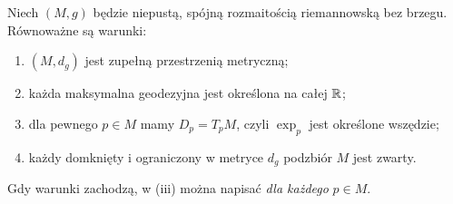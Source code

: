 \begin{twierdzenie}
\label{thm:hopf-rinow-geodezyjne}
Niech $(M,g)$ będzie niepustą, spójną rozmaitością
riemannowską bez brzegu. Równoważne są warunki:
\begin{enumerate}[label=(\roman*)]
\item $(M,d_g)$ jest zupełną przestrzenią metryczną;
\item każda maksymalna geodezyjna jest określona
      na całej $\mathbb{R}$;
\item dla pewnego $p\in M$ mamy $D_p=T_pM$,
      czyli $\exp_p$ jest określone wszędzie;
\item każdy domknięty i ograniczony w metryce
      $d_g$ podzbiór $M$ jest zwarty.
\end{enumerate}
Gdy warunki zachodzą, w (iii) można napisać
\emph{dla każdego} $p\in M$.
\end{twierdzenie}
